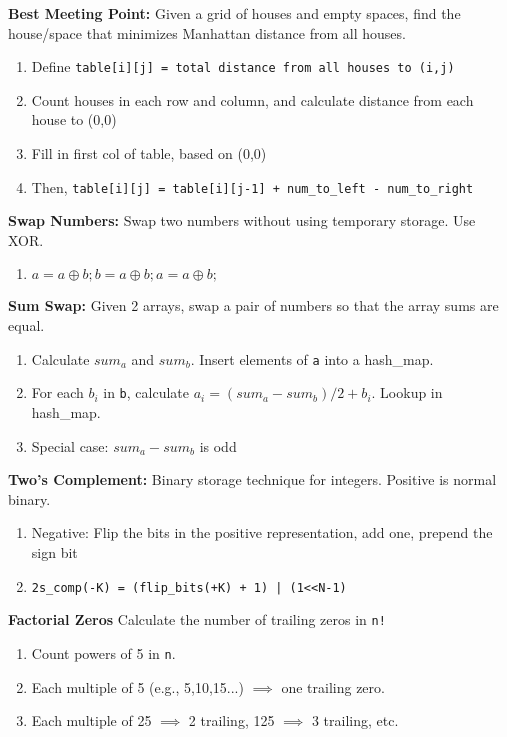 \documentclass[12pt]{article}
\begin{document}
\vspace{5mm}
\noindent
\textbf{Best Meeting Point:}
Given a grid of houses and empty spaces, find the house/space that minimizes Manhattan distance from all houses.
\begin{enumerate}
\item Define \texttt{table[i][j] = total distance from all houses to (i,j)}
\item Count houses in each row and column, and calculate distance from each house to (0,0)
\item Fill in first col of table, based on (0,0)
\item Then, \texttt{table[i][j] = table[i][j-1] + num\_to\_left - num\_to\_right}
\end{enumerate}


\vspace{5mm}
\noindent
\textbf{Swap Numbers:}
Swap two numbers without using temporary storage. Use XOR.
\begin{enumerate}
\item $a = a \oplus b; b = a \oplus b; a = a \oplus b;$ 
\end{enumerate}


\vspace{5mm}
\noindent
\textbf{Sum Swap:}
Given 2 arrays, swap a pair of numbers so that the array sums are equal.
\begin{enumerate}
\item Calculate $sum_a$ and $sum_b$. Insert elements of \texttt{a} into a hash\_map.
\item For each $b_i$ in \texttt{b}, calculate $a_i = (sum_a - sum_b) / 2 + b_i$. Lookup in hash\_map.
\item Special case: $sum_a - sum_b$ is odd
\end{enumerate}


\vspace{5mm}
\noindent
\textbf{Two's Complement:}
Binary storage technique for integers. Positive is normal binary.
\begin{enumerate}
\item Negative: Flip the bits in the positive representation, add one, prepend the sign bit
\item \texttt{2s\_comp(-K) = (flip\_bits(+K) + 1) | (1<<N-1)}
\end{enumerate}


\vspace{5mm}
\noindent
\textbf{Factorial Zeros}
Calculate the number of trailing zeros in \texttt{n!}
\begin{enumerate}
\item Count powers of 5 in \texttt{n}.
\item Each multiple of 5 (e.g., 5,10,15...) $\implies$ one trailing zero. 
\item Each multiple of 25 $\implies$ 2 trailing, 125 $\implies$ 3 trailing, etc.
\end{enumerate}
\end{document}

